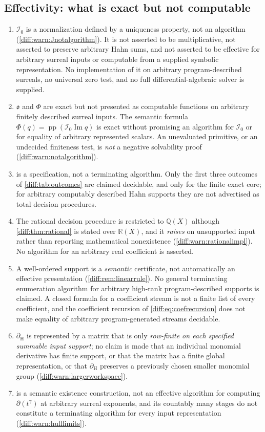 \documentclass[11pt,letterpaper]{article}
\numberwithin{equation}{section}
\theoremstyle{definition}
\theoremstyle{remark}
\newcommand{\R}{\mathbb R}
\newcommand{\Q}{\mathbb Q}
\newcommand{\der}{\partial}
\newcommand{\Izero}{\mathcal I_{0}}
\newcommand{\Obs}{\mathfrak o}
\newcommand{\pp}{\operatorname{pp}}
\newcommand{\Imm}{\operatorname{Im}}
\newcommand{\dercoef}{\der_{\mathrm H}}
\begin{document}
\subsection{Effectivity: what is exact but not computable}
\label{diff:sub:nc:effectivity}

\begin{enumerate}[label=\textup{N\arabic*.},leftmargin=3.0em,itemsep=0.35em,start=14]
\item $\Izero$ is a normalization defined by a uniqueness property, not an
algorithm (\cref{diff:warn:Jnotalgorithm}). It is not asserted to be
multiplicative, not asserted to preserve arbitrary Hahn sums, and not asserted
to be effective for arbitrary surreal inputs or computable from a supplied
symbolic representation. No implementation of it on arbitrary
program-described surreals, no universal zero test, and no full
differential-algebraic solver is supplied.
\item $\Obs$ and $\Phi$ are exact but not presented as computable functions on
arbitrary finitely described surreal inputs. The semantic formula
$\Phi(q)=\pp(\Izero\Imm q)$ is exact without promising an algorithm for
$\Izero$ or for equality of arbitrary represented scalars. An unevaluated
primitive, or an undecided finiteness test, is \emph{not} a negative
solvability proof (\cref{diff:warn:notalgorithm}).
\item {} is a specification, not a terminating algorithm.
Only the first three outcomes of \cref{diff:tab:outcomes} are claimed
decidable, and only for the finite exact core; for arbitrary computably
described Hahn supports they are not advertised as total decision procedures.
\item The rational decision procedure is restricted to $\Q(X)$ although
\cref{diff:thm:rational} is stated over $\R(X)$, and it \emph{raises} on
unsupported input rather than reporting mathematical nonexistence
(\cref{diff:warn:rationalimpl}). No algorithm for an arbitrary real
coefficient is asserted.
\item A well-ordered support is a \emph{semantic} certificate, not
automatically an effective presentation
(\cref{diff:rem:linearrule}). No general terminating enumeration algorithm for
arbitrary high-rank program-described supports is claimed. A closed formula
for a coefficient stream is not a finite list of every coefficient, and the
coefficient recursion of \cref{diff:eq:coefrecursion} does not make equality
of arbitrary program-generated streams decidable.
\item $\dercoef$ is represented by a matrix that is only \emph{row-finite on
each specified summable input support}; no claim is made that an individual
monomial derivative has finite support, or that the matrix has a finite global
representation, or that $\dercoef$ preserves a previously chosen smaller
monomial group (\cref{diff:warn:largerworkspace}).
\item {} is a semantic existence construction, not an
effective algorithm for computing $\der(t^{\gamma})$ at arbitrary surreal
exponents, and its countably many stages do not constitute a terminating
algorithm for every input representation
(\cref{diff:warn:hulllimits}).
\end{enumerate}
\end{document}
